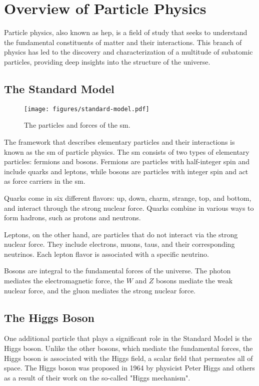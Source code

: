 \section{Overview of Particle Physics}

Particle physics, also known as \gls{hep}, is a field of study that seeks to understand the fundamental
constituents of matter and their interactions. This branch of physics has led to the discovery and characterization of a
multitude of subatomic particles, providing deep insights into the structure of the universe.

\subsection{The Standard Model}

\begin{figure}[htb]
    \centering
    \texttt{[image: figures/standard-model.pdf]}
    \caption{The particles and forces of the \gls{sm}.}
    \label{fig:standard-model}
\end{figure}

The framework that describes elementary particles and their interactions is known as the \gls{sm} of particle
physics. The \gls{sm} consists of two types of elementary particles: fermions and bosons. Fermions are particles with
half-integer spin and include quarks and leptons, while bosons are particles with integer spin and act as force carriers
in the \gls{sm}.

Quarks come in six different flavors: up, down, charm, strange, top, and bottom, and interact
through the strong nuclear force. Quarks combine in various ways to form hadrons, such as protons and neutrons.

Leptons, on the other hand, are particles that do not interact via the strong nuclear force. They include electrons,
muons, taus, and their corresponding neutrinos. Each lepton flavor is associated with a specific neutrino.

Bosons are integral to the fundamental forces of the universe. The photon mediates the electromagnetic force, the $W$
and $Z$ bosons mediate the weak nuclear force, and the gluon mediates the strong nuclear force.

\subsection{The Higgs Boson}

One additional particle that plays a significant role in the Standard Model is the Higgs boson. Unlike the other bosons,
which mediate the fundamental forces, the Higgs boson is associated with the Higgs field, a scalar field that permeates
all of space. The Higgs boson was proposed in 1964 by physicist Peter Higgs and others as a result of their work on the
so-called "Higgs mechanism".

